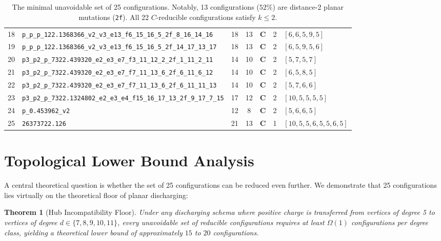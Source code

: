 \documentclass[11pt,a4paper]{article}
\theoremstyle{plain}
\newtheorem{theorem}{Theorem}[section]
\theoremstyle{definition}
\begin{document}
\begin{table}[t]
{\begin{tabular}{r l c c c c l}
18 & \texttt{p\_p\_p\_122.1368366\_v2\_v3\_e13\_f6\_15\_16\_5\_2f\_8\_16\_14\_16} & 18 & 13 & \textbf{C} & 2 & $[6, 6, 5, 9, 5]$ \\
19 & \texttt{p\_p\_p\_122.1368366\_v2\_v3\_e13\_f6\_15\_16\_5\_2f\_14\_17\_13\_17} & 18 & 13 & \textbf{C} & 2 & $[6, 5, 9, 5, 6]$ \\
20 & \texttt{p3\_p2\_p\_7322.439320\_e2\_e3\_e7\_f3\_11\_12\_2\_2f\_1\_11\_2\_11} & 14 & 10 & \textbf{C} & 2 & $[5, 7, 5, 7]$ \\
21 & \texttt{p3\_p2\_p\_7322.439320\_e2\_e3\_e7\_f7\_11\_13\_6\_2f\_6\_11\_6\_12} & 14 & 10 & \textbf{C} & 2 & $[6, 5, 8, 5]$ \\
22 & \texttt{p3\_p2\_p\_7322.439320\_e2\_e3\_e7\_f7\_11\_13\_6\_2f\_6\_11\_11\_13} & 14 & 10 & \textbf{C} & 2 & $[5, 7, 6, 6]$ \\
23 & \texttt{p3\_p2\_p\_7322.1324802\_e2\_e3\_e4\_f15\_16\_17\_13\_2f\_9\_17\_7\_15} & 17 & 12 & \textbf{C} & 2 & $[10, 5, 5, 5, 5]$ \\
24 & \texttt{p\_0.453962\_v2} & 12 & 8  & \textbf{C} & 2 & $[5, 6, 6, 5]$ \\
25 & \texttt{26373722.126} & 21 & 13 & \textbf{C} & 1 & $[10, 5, 5, 6, 5, 5, 6, 5]$ \\
\bottomrule
\end{tabular}%
}
\caption{The minimal unavoidable set of 25 configurations. Notably, 13 configurations ($52\%$) are distance-2 planar mutations (\texttt{2f}). All 22 $C$-reducible configurations satisfy $k \le 2$.}
\label{tab:catalog25}
\end{table}

\section{Topological Lower Bound Analysis}

A central theoretical question is whether the set of 25 configurations can be reduced even further. We demonstrate that 25 configurations lies virtually on the theoretical floor of planar discharging:

\begin{theorem}[Hub Incompatibility Floor]
Under any discharging schema where positive charge is transferred from vertices of degree 5 to vertices of degree $d \in \{7, 8, 9, 10, 11\}$, every unavoidable set of reducible configurations requires at least $\Omega(1)$ configurations per degree class, yielding a theoretical lower bound of approximately $15$ to $20$ configurations.
\end{theorem}
\end{document}
